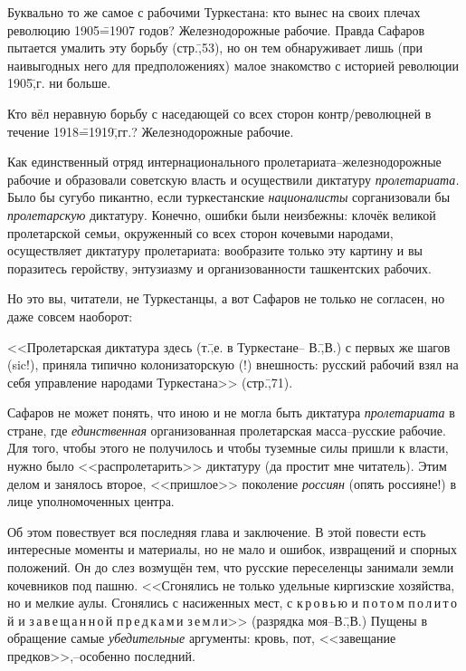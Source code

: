Буквально то же самое с рабочими Туркестана: кто вынес на своих плечах революцию 1905\==1907 годов? Железнодорожные рабочие. Правда Сафаров пытается умалить эту борьбу (стр.\=,53), но он тем обнаруживает лишь (при наивыгодных него для предположениях) малое знакомство с историей революции 1905\=,г. ни больше.

Кто вёл неравную борьбу с наседающей со всех сторон контр\-/революцней в течение 1918\==1919\=,гг.? Железнодорожные рабочие.

Как единственный отряд интернационального пролетариата\---железнодорожные рабочие и образовали советскую власть и осуществили диктатуру \emph{пролетариата.} Было бы сугубо пикантно, если туркестанские \emph{националисты} сорганизовали бы \emph{пролетарскую} диктатуру. Конечно, ошибки были неизбежны: клочёк великой пролетарской семьи, окруженный со всех сторон кочевыми народами, осуществляет диктатуру пролетариата: вообразите только эту картину и вы поразитесь геройству, энтузиазму и организованности ташкентских рабочих.

Но это вы, читатели, не Туркестанцы, а вот Сафаров не только не согласен, но даже совсем наоборот:

<<Пролетарская диктатура здесь (т.\=,е. в Туркестане\--- В.\=,В.) с первых же шагов (sic!), приняла типично колонизаторскую (!) внешность: русский рабочий взял на себя \glqq управление народами Туркестана\grqq >> (стр.\=,71).

Сафаров не может понять, что иною и не могла быть диктатура \emph{пролетариата} в стране, где \emph{единственная} организованная пролетарская масса\---русские рабочие. Для того, чтобы этого не получилось и чтобы туземные силы пришли к власти, нужно было <<распролетарить>> диктатуру (да простит мне читатель). Этим делом и занялось второе, <<пришлое>> поколение \emph{россиян} (опять россияне!) в лице уполномоченных центра.

Об этом повествует вся последняя глава и заключение. В этой повести есть интересные моменты и материалы, но не мало и ошибок, извращений и спорных положений. Он до слез возмущён тем, что русские переселенцы занимали земли кочевников под пашню. <<Сгонялись не только удельные киргизские хозяйства, но и мелкие аулы. Сгонялись с насиженных мест, с к\,р\,о\,в\,ь\,ю и п\,о\,т\,о\,м п\,о\,л\,и\,т\,о\,й и з\,а\,в\,е\,щ\,а\,н\,н\,о\,й п\,р\,е\,д\,к\,а\,м\,и з\,е\,м\,л\,и>> (разрядка моя\---В.\=,В.) Пущены в обращение самые \emph{убедительные} аргументы: кровь, пот, <<завещание предков>>,\---особенно последний.

